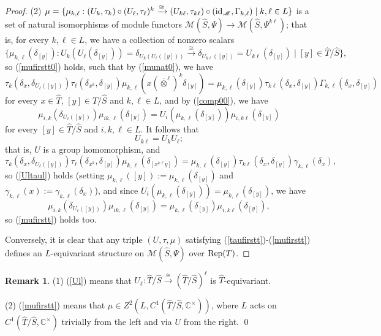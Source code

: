 \documentclass{amsart}
\theoremstyle{definition}
\newtheorem{remark}[theorem]{Remark}
\newcommand{\id}{{\rm id}}
\newcommand{\Rep}{{\rm Rep}}
\newcommand{\M}{\mathscr{M}}
\newcommand{\ot}{\otimes}
\numberwithin{equation}{section}
\begin{document}
\begin{proof}
(2) $\mu=\{\mu_{k,\ell}: (U_{k},\tau_{k})\circ(U_{\ell},\tau_{\ell})^k\xrightarrow{\cong}(U_{k\ell},\tau_{k\ell})\circ(\id_{\M},\Gamma_{k,\ell})\mid k,\ell\in L\}$ is a set of natural isomorphisms of module functors $\M(\widehat{S},\Psi)\to \M(\widehat{S},\Psi^{k\ell})$; that is, 
for every $k,\ell\in L$, we have a collection of nonzero scalars 
$$\{\mu_{k,\ell}(\delta_{[y]}): U_k(U_{\ell}(\delta_{[y]}))=\delta_{U_{k}(U_{\ell}([y]))}\xrightarrow{\cong}\delta_{U_{k\ell}([y])}=U_{k\ell}(\delta_{[y]})\mid [y]\in \widehat{T}/\widehat{S}\},$$
so (\ref{mufirstt0}) holds, 
such that by (\ref{munat0}), we have 
$$
\tau_k(\delta_x,\delta_{U_{\ell}([y])})\tau_{\ell}(\delta_{x^k},\delta_{[y]})\mu_{k,\ell}(x(\overline{\ot}^{\ell})^k \delta_{[y]})=\mu_{k,\ell}(\delta_{[y]})\tau_{k\ell}(\delta_x,\delta_{[y]})\Gamma_{k,\ell}(\delta_x,\delta_{[y]})$$
for every $x\in \widehat{T}$, $[y]\in \widehat{T}/\widehat{S}$ and $k,\ell\in L$,  
and by (\ref{comp00}), we have 
$$
\mu_{i,k}(\delta_{U_{\ell}([y])})\mu_{ik,\ell}(\delta_{[y]})=U_i(\mu_{k,\ell}(\delta_{[y]}))\mu_{i,k\ell}(\delta_{[y]})
$$
for every $[y]\in \widehat{T}/\widehat{S}$ and $i,k,\ell\in L$. 
It follows that  
\begin{equation*}
U_{k\ell}=U_{k}U_{\ell};
\end{equation*}
that is, $U$ is a group homomorphism, and
\begin{equation*}
\tau_k(\delta_x,\delta_{U_{\ell}([y])})\tau_{\ell}(\delta_{x^k},\delta_{[y]})\mu_{k,\ell}(\delta_{[x^{k\ell}y]})=\mu_{k,\ell}(\delta_{[y]})\tau_{k\ell}(\delta_x,\delta_{[y]})\gamma_{k,\ell}(\delta_{x}),
\end{equation*}
so (\ref{Ultaul}) holds (setting $\mu_{k,\ell}([y]):=\mu_{k,\ell}(\delta_{[y]})$ and $\gamma_{k,\ell}(x):=\gamma_{k,\ell}(\delta_{x})$), 
and since $U_i(\mu_{k,\ell}(\delta_{[y]}))=\mu_{k,\ell}(\delta_{[y]})$, we have
\begin{equation*}
\mu_{i,k}(\delta_{U_{\ell}([y])})\mu_{ik,\ell}(\delta_{[y]})=\mu_{k,\ell}(\delta_{[y]})\mu_{i,k\ell}(\delta_{[y]}),
\end{equation*}
so (\ref{mufirstt}) holds too.

Conversely, it is clear that any triple $(U,\tau,\mu)$ satisfying (\ref{taufirstt})-(\ref{mufirstt}) defines an $L$-equivariant structure on $\M(\widehat{S},\Psi)$ over $\Rep(T)$.
\end{proof}

\begin{remark}

(1) (\ref{Ul}) means that $U_{\ell}:\widehat{T}/\widehat{S}\xrightarrow{\cong}(\widehat{T}/\widehat{S})^{\ell}$ is $\widehat{T}$-equivariant.

(2) (\ref{mufirstt}) means that $\mu\in Z^2(L,C^1(\widehat{T}/\widehat{S},\mathbb{C}^{\times}))$, where $L$ acts on $C^1(\widehat{T}/\widehat{S},\mathbb{C}^{\times})$ trivially from the left and via $U$ from the right. \qed
\end{remark}
\end{document}
